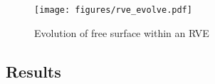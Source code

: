 \documentclass[11pt]{beamer} %
\begin{document}
\begin{frame}
\begin{figure}[hbpt]
 \centering
 \texttt{[image: figures/rve\_evolve.pdf]} %
 \caption{Evolution of free surface within an RVE}\label{fig:rve_evolution}
\end{figure}
\end{frame}

\subsection{Results}
% 
\end{document}
